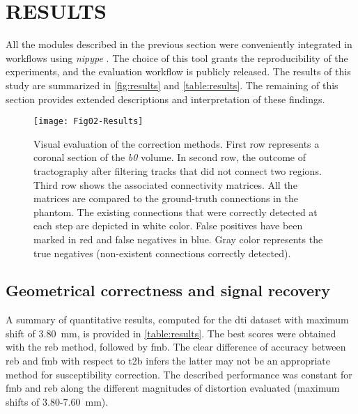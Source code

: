 \section{RESULTS}
\label{sec:results}

All the modules described in the previous section were
conveniently integrated in workflows using \emph{nipype}
\cite{gorgolewski_nipype:_2011}. The choice of this tool
grants the reproducibility of the experiments,
and the evaluation workflow is publicly released.
The results of this study are summarized
in \autoref{fig:results} and \autoref{table:results}.
The remaining of this section provides extended descriptions
and interpretation of these findings.

\begin{figure*}[tpb]
   \centering
   \texttt{[image: Fig02-Results]}
   \caption{Visual evaluation of the correction methods.
   First row represents a coronal section of the \textit{b0} volume. 
   In second row, the outcome of tractography after filtering tracks
   that did not connect two regions.
   Third row shows the associated connectivity matrices. All the matrices
   are compared to the ground-truth connections in the phantom. The existing
   connections that were correctly detected at each step are depicted in white
   color. False positives have been marked in red and false negatives in blue.
   Gray color represents the true negatives (non-existent connections correctly detected).}
   \label{fig:results}
\end{figure*}


\subsection{Geometrical correctness and signal recovery}

A summary of quantitative results, computed for the \gls*{dti} 
dataset with maximum shift of 3.80~mm,
is provided in \autoref{table:results}.
The best scores were obtained with the \gls*{reb} 
method, followed by \gls*{fmb}. 
The clear difference of accuracy between \gls*{reb} and \gls*{fmb}
with respect to \gls*{t2b} infers the latter may not be
an appropriate method for susceptibility correction. 
The described performance was constant for \gls*{fmb} 
and \gls*{reb} along the different magnitudes of 
distortion evaluated (maximum shifts of 3.80-7.60~mm).





